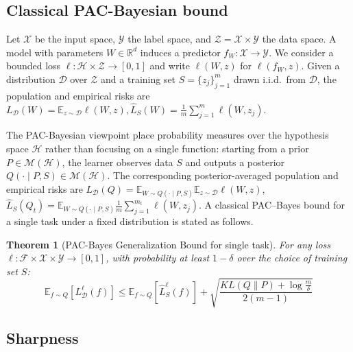 \documentclass{article}
\theoremstyle{plain}
\newtheorem{theorem}{Theorem}[section]
\theoremstyle{definition}
\theoremstyle{remark}
\begin{document}
\subsection{Classical PAC-Bayesian bound}
Let $\mathcal X$ be the input space, $\mathcal Y$ the label space, and $\mathcal Z = \mathcal X \times \mathcal Y$ the data space.
A model with parameters $W \in \mathbb R^d$ induces a predictor $f_W : \mathcal X \to \mathcal Y$.
We consider a bounded loss $\ell : \mathcal H \times \mathcal Z \to [0,1]$ and write $\ell(W,z)$ for $\ell(f_W,z)$. 
Given a distribution $\mathcal D$ over $\mathcal Z$ and a training set $S=\{z_j\}_{j=1}^m$ drawn i.i.d.\ from $\mathcal D$, the population and empirical risks are
$
L_{\mathcal D}(W)
=
\mathbb E_{z\sim\mathcal D}\ell(W,z),
\hat L_{S}(W)
=
\frac{1}{m}\sum_{j=1}^{m}\ell(W,z_{j}).
$


The PAC-Bayesian viewpoint place probability measures over the hypothesis space $\mathcal{H}$ rather than focusing on a single function: starting from a prior $P\in\mathcal M(\mathcal H)$, the learner observes data $S$ and outputs a posterior $Q(\cdot\mid P,S)\in\mathcal M(\mathcal H)$\cite{mcallesterPACBayesianModelAveraging1999}. The corresponding posterior-averaged population and empirical risks  are $
L_{\mathcal D}(Q)
=
\mathbb E_{W \sim Q(\cdot \mid P,S)}\mathbb E_{z\sim\mathcal D}\ell(W,z)
$,
$
\hat L_{S}(Q_t)
=
\mathbb E_{W \sim Q(\cdot \mid P,S)}\frac{1}{m}\sum_{j=1}^{m_t}\ell(W,z_{j}).
$
A classical PAC--Bayes bound \cite{mcallesterPACBayesianStochasticModel2003} for a single task under a fixed distribution is stated as follows.
\begin{theorem}[PAC-Bayes Generalization Bound for single task]
\label{theorem:classical}
For any loss $\ell: \mathcal{F} \times \mathcal{X} \times \mathcal{Y} \to [0,1]$, with probability at least $1-\delta$ over the choice of training set $S$:
{%
\setlength{\abovedisplayskip}{2pt}
\setlength{\belowdisplayskip}{3pt}
\setlength{\abovedisplayshortskip}{3pt}
\setlength{\belowdisplayshortskip}{3pt}
    \[\mathbb{E}_{f \sim Q}[L_{\mathcal{D}}^{\ell}(f)] \leq \mathbb{E}_{f \sim Q}[\hat{L}_S^{\ell}(f)] + \sqrt{\frac{KL(Q\|P) + \log \frac{m}{\delta}}{2(m-1)}}\]
}
\end{theorem}
\vspace{-8pt}
\subsection{Sharpness}
\end{document}
